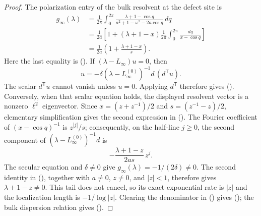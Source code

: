 \documentclass[twoside,10pt]{article}
\numberwithin{equation}{section}
\theoremstyle{slbody}
\theoremstyle{definition}
\theoremstyle{remark}
\renewcommand{\eqref}[1]{%
  \textup{{\normalfont(\oldstylenums{\ref{#1}}}\normalfont)}}
\begin{document}
\begin{proof}
The polarization entry of the bulk resolvent at the defect site is
\begin{align*}
 g_\infty(\lambda)
 &=\frac1{2\pi}\int_0^{2\pi}
   \frac{\lambda+1-\cos q}
        {a^2+1-\omega^2-2a\cos q}\,dq\\
 &=\frac1{2a}\left[1+(\lambda+1-x)
       \frac1{2\pi}\int_0^{2\pi}\frac{dq}{x-\cos q}\right]\\
 &=\frac1{2a}\left(1+\frac{\lambda+1-x}{s}\right).
\end{align*}
Here the last equality is \eqref{eq:green-circle-integral}.
If $(\lambda-L_\infty)u=0$, then
\[
 u=-\delta(\lambda-L_\infty^{(0)})^{-1}d\,(d^{\mathsf T}u).
\]
The scalar $d^{\mathsf T}u$ cannot vanish unless $u=0$.  Applying
$d^{\mathsf T}$ therefore gives \eqref{eq:localization-secular}.
Conversely, when that scalar equation holds, the displayed resolvent
vector is a nonzero $\ell^2$ eigenvector.  Since
$x=(z+z^{-1})/2$ and $s=(z^{-1}-z)/2$, elementary simplification gives
the second expression in \eqref{eq:localization-green}.  The Fourier
coefficient of $(x-\cos q)^{-1}$ is $z^{|j|}/s$; consequently, on the
half-line $j\ge0$, the second component of
$(\lambda-L_\infty^{(0)})^{-1}d$ is
\[
 -\frac{\lambda+1-z}{2as}\,z^j.
\]
The secular equation and $\delta\ne0$ give
$g_\infty(\lambda)=-1/(2\delta)\ne0$.  The second identity in
\eqref{eq:localization-green}, together with $a\ne0$, $z\ne0$, and
$|z|<1$, therefore gives $\lambda+1-z\ne0$.  This tail does not cancel,
so its exact exponential rate is $|z|$ and the localization length is
$-1/\log|z|$.  Clearing the denominator in
\eqref{eq:localization-secular} gives
\eqref{eq:loc-match}; the bulk dispersion relation gives
\eqref{eq:loc-dispersion}.
\end{proof}
\end{document}
